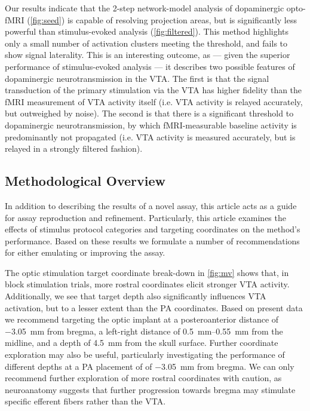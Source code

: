 Our results indicate that the 2-step network-model analysis of dopaminergic opto-fMRI (\cref{fig:seed}) is capable of resolving projection areas, but is significantly less powerful than stimulus-evoked analysis (\cref{fig:filtered}).
This method highlights only a small number of activation clusters meeting the threshold, and fails to show signal laterality.
This is an interesting outcome, as --- given the superior performance of stimulus-evoked analysis --- it describes two possible features of dopaminergic neurotransmission in the VTA.
The first is that the signal transduction of the primary stimulation via the VTA has higher fidelity than the fMRI measurement of VTA activity itself (i.e. VTA activity is relayed accurately, but outweighed by noise).
The second is that there is a significant threshold to dopaminergic neurotransmission, by which fMRI-measurable baseline activity is predominantly not propagated (i.e. VTA activity is measured accurately, but is relayed in a strongly filtered fashion).

\subsection{Methodological Overview}

In addition to describing the results of a novel assay, this article acts as a guide for assay reproduction and refinement.
Particularly, this article examines the effects of stimulus protocol categories and targeting coordinates on the method's performance.
Based on these results we formulate a number of recommendations for either emulating or improving the assay.

The optic stimulation target coordinate break-down in \cref{fig:mv} shows that, in block stimulation trials, more rostral coordinates elicit stronger VTA activity.
Additionally, we see that target depth also significantly influences VTA activation, but to a lesser extent than the PA coordinates.
Based on present data we recommend targeting the optic implant at
a posteroanterior distance of \SI{-3.05}{\milli\meter} from bregma,
a left-right distance of \SIrange{0.5}{0.55}{\milli\meter} from the midline,
and a depth of \SI{4.5}{\milli\meter} from the skull surface.
Further coordinate exploration may also be useful, particularly investigating the performance of different depths at a PA placement of of \SI{-3.05}{\milli\meter} from bregma.
We can only recommend further exploration of more rostral coordinates with caution, as neuroanatomy suggests that further progression towards bregma may stimulate specific efferent fibers rather than the VTA.

